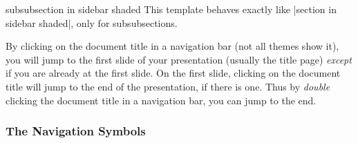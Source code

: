 \begin{element}{subsubsection in sidebar shaded}\yes\no\no
  This template behaves exactly like |section in sidebar shaded|, only for subsubsections.
\end{element}

By clicking on the document title in a navigation bar (not all themes show it), you will jump to the first slide of your presentation (usually the title page) \emph{except} if you are already at the first slide. On the first slide, clicking on the document title will jump to the end of the presentation, if there is one. Thus by \emph{double} clicking the document title in a navigation bar, you can jump to the end.

\subsubsection{The Navigation Symbols}
\label{section-navigation-symbols}

\begingroup
\makeatletter
\newcommand{\beamer@linkspace}[1]{}
\renewcommand{\Acrobatmenu}[2]{}
\renewcommand{\usebeamercolor}[2][]{\color{.!20}}
\makeatother

